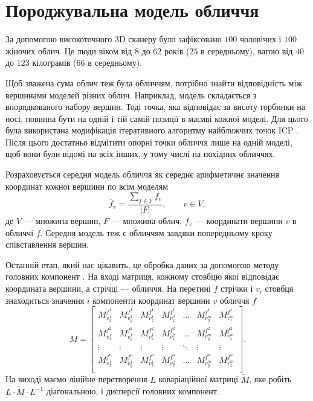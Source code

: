 \section{Породжувальна модель обличчя}

За допомогою високоточного 3D сканеру
було зафіксовано $100$ чоловічих і $100$ жіночих облич.
Це люди віком від $8$ до $62$ років ($25$ в середньому),
вагою від $40$ до $123$ кілограмів ($66$ в середньому).

Щоб зважена сума облич теж була обличчям,
потрібно знайти відповідність між вершинами моделей різних облич.
Наприклад, модель складається з впорядкованого набору вершин.
Тоді точка, яка відповідає за висоту горбинки на носі,
повинна бути на одній і тій самій позиції в масиві кожної моделі.
Для цього була використана модифікація
ітеративного алгоритму найближчих точок ICP \cite{AmbergRV07}.
Після цього достатньо відмітити опорні точки обличчя лише на одній моделі,
щоб вони були відомі на всіх інших,
у тому числі на похідних обличчях.

Розраховується середня модель обличчя як
середнє арифметичнє значення координат кожної вершини по всім моделям
\begin{equation*}
  \overline{f}_v
  = \frac{\sum\limits_{f \in F} f_v}{\left| F \right|},\qquad
  v \in V,
\end{equation*}
де $V$ --- множина вершин, $F$ --- множина облич,
$f_v$ --- координати вершини $v$ в обличчі $f$.
Середня модель теж є обличчям завдяки попередньому кроку співставлення вершин.

Останній етап, який нас цікавить,
це обробка даних за допомогою методу головних компонент \cite{Aivazyan:1989}.
На вході матриця, кожному стовбцю якої відповідає координата вершини,
а стрічці --- обличчя.
На перетині $f$ стрічки і $v_i$ стовбця знаходиться значення $i$ компоненти
координат вершини $v$ обличчя $f$
\begin{equation*}
  M = \begin{bmatrix}
    M_{v_x^1}^{f^1} & M_{v_y^1}^{f^1} & M_{v_z^1}^{f^1} & M_{v_x^2}^{f^1}
      & \dots                         & M_{v_y^m}^{f^1} & M_{v_z^m}^{f^1} \\
    M_{v_x^1}^{f^2} & M_{v_y^1}^{f^2} & M_{v_z^1}^{f^2} & M_{v_x^2}^{f^2}
      & \dots                         & M_{v_y^m}^{f^2} & M_{v_z^m}^{f^2} \\
    \vdots          & \vdots          & \vdots          & \vdots
      & \ddots                        & \vdots          & \vdots \\
    M_{v_x^1}^{f^n} & M_{v_y^1}^{f^n} & M_{v_z^1}^{f^n} & M_{v_x^2}^{f^n}
      & \dots                         & M_{v_y^m}^{f^n} & M_{v_z^m}^{f^n} \\
  \end{bmatrix}.
\end{equation*}
На виході маємо лінійне перетворення $L$ коваріаційної матриці $\widetilde{M}$,
яке робіть $L \cdot \widetilde{M} \cdot L^{-1}$ діагональною,
і дисперсії головних компонент.

